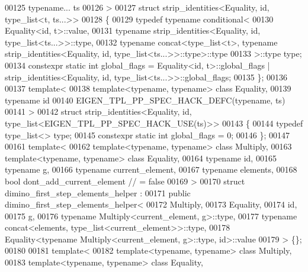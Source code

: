 \begin{DoxyCode}
00125   \textcolor{keyword}{typename}... ts
00126 >
00127 \textcolor{keyword}{struct }strip\_identities<Equality, id, type\_list<t, ts...>>
00128 \{
00129   \textcolor{keyword}{typedef} \textcolor{keyword}{typename} conditional<
00130     Equality<id, t>::value,
00131     \textcolor{keyword}{typename} strip\_identities<Equality, id, type\_list<ts...>>::type,
00132     \textcolor{keyword}{typename} concat<type\_list<t>, \textcolor{keyword}{typename} strip\_identities<Equality, id, type\_list<ts...>>::type>::type
00133   >::type type;
00134   constexpr \textcolor{keyword}{static} \textcolor{keywordtype}{int} global\_flags = Equality<id, t>::global\_flags | strip\_identities<Equality, id, 
      type\_list<ts...>>::global\_flags;
00135 \};
00136 
00137 \textcolor{keyword}{template}<
00138   \textcolor{keyword}{template}<\textcolor{keyword}{typename}, \textcolor{keyword}{typename}> \textcolor{keyword}{class }Equality,
00139   \textcolor{keyword}{typename} \textcolor{keywordtype}{id}
00140   EIGEN\_TPL\_PP\_SPEC\_HACK\_DEFC(\textcolor{keyword}{typename}, ts)
00141 >
00142 \textcolor{keyword}{struct }strip\_identities<Equality, id, type\_list<EIGEN\_TPL\_PP\_SPEC\_HACK\_USE(ts)>>
00143 \{
00144   \textcolor{keyword}{typedef} type\_list<> type;
00145   constexpr \textcolor{keyword}{static} \textcolor{keywordtype}{int} global\_flags = 0;
00146 \};
00147 
00161 \textcolor{keyword}{template}<
00162   \textcolor{keyword}{template}<\textcolor{keyword}{typename}, \textcolor{keyword}{typename}> \textcolor{keyword}{class }Multiply,
00163   \textcolor{keyword}{template}<\textcolor{keyword}{typename}, \textcolor{keyword}{typename}> \textcolor{keyword}{class }Equality,
00164   \textcolor{keyword}{typename} id,
00165   \textcolor{keyword}{typename} g,
00166   \textcolor{keyword}{typename} current\_element,
00167   \textcolor{keyword}{typename} elements,
00168   \textcolor{keywordtype}{bool} dont\_add\_current\_element   \textcolor{comment}{// = false}
00169 >
00170 \textcolor{keyword}{struct }dimino\_first\_step\_elements\_helper :
00171   \textcolor{keyword}{public} dimino\_first\_step\_elements\_helper<
00172     Multiply,
00173     Equality,
00174     id,
00175     g,
00176     typename Multiply<current\_element, g>::type,
00177     typename concat<elements, type\_list<current\_element>>::type,
00178     Equality<typename Multiply<current\_element, g>::type, id>::value
00179   > \{\};
00180 
00181 \textcolor{keyword}{template}<
00182   \textcolor{keyword}{template}<\textcolor{keyword}{typename}, \textcolor{keyword}{typename}> \textcolor{keyword}{class }Multiply,
00183   \textcolor{keyword}{template}<\textcolor{keyword}{typename}, \textcolor{keyword}{typename}> \textcolor{keyword}{class }Equality,

\end{DoxyCode}
